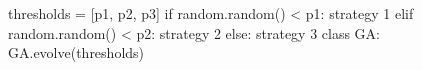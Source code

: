 thresholds = [p1, p2, p3] if random.random() < p1: \markdownRendererHash{} strategy 1\markdownRendererEllipsis{} elif random.random() < p2: \markdownRendererHash{} strategy 2\markdownRendererEllipsis{} else: \markdownRendererHash{} strategy 3\markdownRendererEllipsis{}\markdownRendererInterblockSeparator
{}class GA: \markdownRendererEllipsis{}\markdownRendererInterblockSeparator
{}GA.evolve(thresholds)\relax
